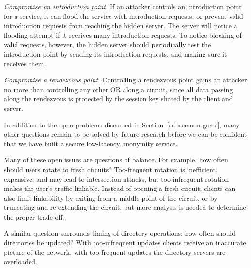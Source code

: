 \documentclass[times,10pt,twocolumn]{article}
\begin{document}
\emph{Compromise an introduction point.} If an attacker controls
an introduction point for a service, it can flood the service with
introduction requests, or prevent valid introduction requests from
reaching the hidden server.  The server will notice a flooding
attempt if it receives many introduction requests.  To notice
blocking of valid requests, however, the hidden server should
periodically test the introduction point by sending its introduction
requests, and making sure it receives them.

\emph{Compromise a rendezvous point.}  Controlling a rendezvous
point gains an attacker no more than controlling any other OR along
a circuit, since all data passing along the rendezvous is protected
by the session key shared by the client and server.

\label{sec:maintaining-anonymity}
 
In addition to the open problems discussed in
Section~\ref{subsec:non-goals}, many other questions remain to be
solved by future research before we can be confident that we
have built a secure low-latency anonymity service.

Many of these open issues are questions of balance.  For example,
how often should users rotate to fresh circuits?  Too-frequent
rotation is inefficient, expensive, and may lead to intersection attacks,
but too-infrequent rotation
makes the user's traffic linkable.   Instead of opening a fresh
circuit; clients can also limit linkability by exiting from a middle point
of the circuit, or by truncating and re-extending the circuit, but
more analysis is needed to determine the proper trade-off.

A similar question surrounds timing of directory operations:
how often should directories be updated?  With too-infrequent
updates clients receive an inaccurate picture of the network; with
too-frequent updates the directory servers are overloaded.

%

\end{document}
